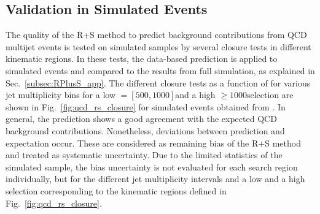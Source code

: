 \subsection{Validation in Simulated Events}
\label{subsec:validation_mc}
The quality of the R+S method to predict background contributions from QCD multijet events is tested on simulated samples by several closure tests in different kinematic regions. In these tests, the data-based prediction is applied to simulated events and compared to the results from full simulation, as explained in Sec.~\ref{subsec:RPlusS_app}. The different closure tests as a function of \MHT for various jet multiplicity bins for a low \HT $= [500, 1000]$\gev and a high \HT $\ge 1000$\gev selection are shown in Fig.~\ref{fig:qcd_rs_closure} for simulated events obtained from \madgraph. In general, the prediction shows a good agreement with the expected QCD background contributions. Nonetheless, deviations between prediction and expectation occur. These are considered as remaining bias of the R+S method and treated as systematic uncertainty. Due to the limited statistics of the simulated sample, the bias uncertainty is not evaluated for each search region individually, but for the different jet multiplicity intervals and a low and a high \HT selection corresponding to the kinematic regions defined in Fig.~\ref{fig:qcd_rs_closure}.
